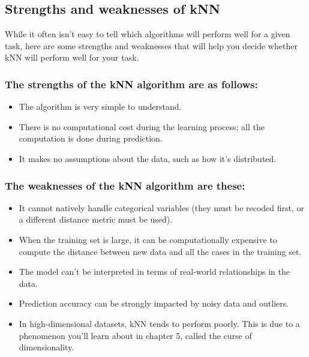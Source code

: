 \documentclass[
]{article}
\providecommand{\tightlist}{%
  \setlength{\itemsep}{0pt}\setlength{\parskip}{0pt}}
\begin{document}
\subsection{Strengths and weaknesses of
kNN}\label{strengths-and-weaknesses-of-knn}

While it often isn't easy to tell which algorithms will perform well for
a given task, here are some strengths and weaknesses that will help you
decide whether kNN will perform well for your task.

\subsubsection{The strengths of the kNN algorithm are as
follows:}\label{the-strengths-of-the-knn-algorithm-are-as-follows}

\begin{itemize}
\tightlist
\item
  The algorithm is very simple to understand.
\item
  There is no computational cost during the learning process; all the
  computation is done during prediction.
\item
  It makes no assumptions about the data, such as how it's distributed.
\end{itemize}

\subsubsection{The weaknesses of the kNN algorithm are
these:}\label{the-weaknesses-of-the-knn-algorithm-are-these}

\begin{itemize}
\tightlist
\item
  It cannot natively handle categorical variables (they must be recoded
  first, or a different distance metric must be used).
\item
  When the training set is large, it can be computationally expensive to
  compute the distance between new data and all the cases in the
  training set.
\item
  The model can't be interpreted in terms of real-world relationships in
  the data.
\item
  Prediction accuracy can be strongly impacted by noisy data and
  outliers.
\item
  In high-dimensional datasets, kNN tends to perform poorly. This is due
  to a phenomenon you'll learn about in chapter 5, called the curse of
  dimensionality.
\end{itemize}
\end{document}
